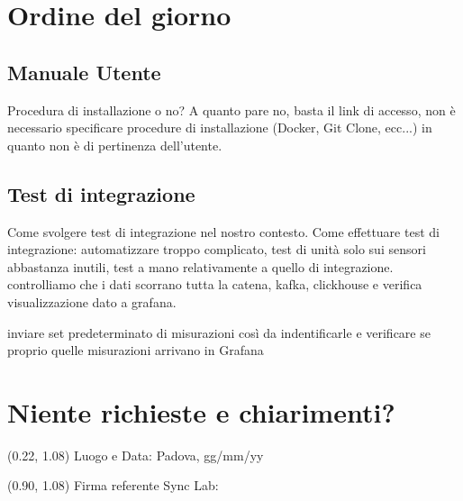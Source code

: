 \documentclass{article}
\begin{document}
\section{Ordine del giorno}

    \subsection{Manuale Utente}
    Procedura di installazione o no? 
    A quanto pare no, basta il link di accesso, non è necessario specificare procedure di installazione (Docker, Git Clone, ecc...) in quanto non è di pertinenza dell'utente.

    \subsection{Test di integrazione}
    Come svolgere test di integrazione nel nostro contesto.
    Come effettuare test di integrazione: automatizzare troppo complicato, test di unità solo sui sensori abbastanza inutili, test a mano relativamente a quello di integrazione. controlliamo che i dati scorrano tutta la catena, kafka, clickhouse e verifica visualizzazione dato a grafana.
    
    inviare set predeterminato di misurazioni così da indentificarle e verificare se proprio quelle misurazioni arrivano in Grafana     

\section{Niente richieste e chiarimenti?}

\begin{textblock*}{\textwidth}(0.22\textwidth, 1.08\textheight)
    Luogo e Data: Padova, gg/mm/yy
\end{textblock*}

\begin{textblock*}{\textwidth}(0.90\textwidth, 1.08\textheight)
        Firma referente Sync Lab:
\end{textblock*}
\end{document}
